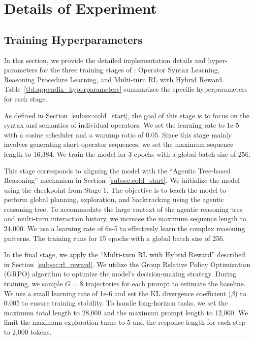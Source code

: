 \section{Details of Experiment}
\label{sec:appendix_experiment}

\subsection{Training Hyperparameters}



In this section, we provide the detailed implementation details and hyper-parameters for the three training stages of \sys: Operator Syntax Learning, Reasoning Procedure Learning, and Multi-turn RL with Hybrid Reward. Table~\ref{tbl:appendix_hyperparameters} summarizes the specific hyperparameters for each stage.

As defined in Section~\ref{subsec:cold_start}, the goal of this stage is to focus on the syntax and semantics of individual operators. 
We set the learning rate to 1e-5 with a cosine scheduler and a warmup ratio of 0.05. Since this stage mainly involves generating short operator sequences, we set the maximum sequence length to 16,384. We train the model for 3 epochs with a global batch size of 256.

This stage corresponds to aligning the model with the ``Agentic Tree-based Reasoning'' mechanism in Section~\ref{subsec:cold_start}. We initialize the model using the checkpoint from Stage 1. The objective is to teach the model to perform global planning, exploration, and backtracking using the agentic reasoning tree.
To accommodate the large context of the agentic reasoning tree and multi-turn interaction history, we increase the maximum sequence length to 24,000. We use a learning rate of 6e-5 to effectively learn the complex reasoning patterns. The training runs for 15 epochs with a global batch size of 256.

In the final stage, we apply the ``Multi-turn RL with Hybrid Reward'' described in Section~\ref{subsec:rl_reward}. We utilize the Group Relative Policy Optimization (GRPO) algorithm to optimize the model's decision-making strategy.
During training, we sample $G=8$ trajectories for each prompt to estimate the baseline. We use a small learning rate of 1e-6 and set the KL divergence coefficient ($\beta$) to 0.005 to ensure training stability.
To handle long-horizon tasks, we set the maximum total length to 28,000 and the maximum prompt length to 12,000. We limit the maximum exploration turns to 5 and the response length for each step to 2,000 tokens.

